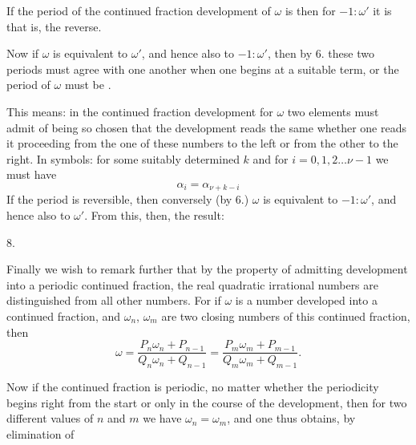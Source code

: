 If the period of the continued fraction development of $\omega$ is
then for $-1 : \omega'$ it is
that is, the reverse.

Now if $\omega$ is equivalent to $\omega'$, and hence also to $-1 : \omega'$, then
by 6. these two periods must agree with one another when one
begins at a suitable term, or the period of
$\omega$ must be .

This means: in the continued fraction development
for $\omega$ two elements must admit of being so chosen that the development
reads the same whether one reads it proceeding from the one of these numbers to
the left or from the other to the right.
In symbols: for some suitably determined $k$ and
for $i = 0, 1, 2 \ldots \nu - 1$ we must have
\[
\alpha_i = \alpha_{\nu+k-i}
\]
If the period is reversible, then conversely
(by 6.) $\omega$ is equivalent to $-1 : \omega'$, and hence also to $\omega'$. From this,
then, the result:

8. 

Finally we wish to remark further that by the property
of admitting development into a periodic continued fraction,
the real quadratic irrational numbers are distinguished from all other
numbers. For if $\omega$ is a number developed into a continued
fraction, and $\omega_n$, $\omega_m$ are two closing numbers
of this continued fraction, then
\[
\omega = \frac{P_n\omega_n + P_{n-1}}{Q_n\omega_n + Q_{n-1}} = \frac{P_m\omega_m + P_{m-1}}{Q_m\omega_m + Q_{m-1}}.
\]

Now if the continued fraction is periodic, no matter whether
the periodicity begins right from the start or only in the course
of the development, then for two different values of $n$
and $m$ we have $\omega_n = \omega_m$, and one thus obtains, by elimination of
